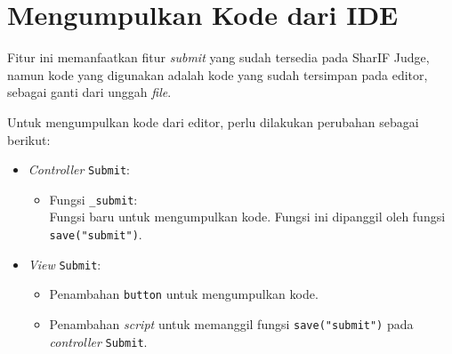 \section{Mengumpulkan Kode dari IDE}
\label{sec:4:kumpul}

Fitur ini memanfaatkan fitur \textit{submit} yang sudah tersedia pada SharIF Judge, namun kode yang digunakan adalah kode yang sudah tersimpan pada editor, sebagai ganti dari unggah \textit{file}. 

Untuk mengumpulkan kode dari editor, perlu dilakukan perubahan sebagai berikut:
\begin{itemize}
	\item \textit{Controller} \verb|Submit|:
    \begin{itemize}
		\item Fungsi \verb|_submit|: \\ Fungsi baru untuk mengumpulkan kode. Fungsi ini dipanggil oleh fungsi \verb|save("submit")|.
    \end{itemize}
    \item \textit{View} \verb|Submit|:
    \begin{itemize}
        \item Penambahan \verb|button| untuk mengumpulkan kode.
        \item Penambahan \textit{script} untuk memanggil fungsi \verb|save("submit")| pada \textit{controller} \verb|Submit|. 
    \end{itemize}
\end{itemize}
